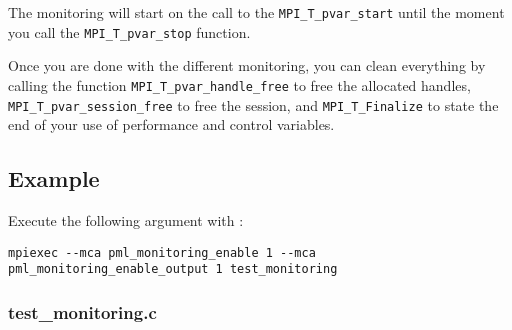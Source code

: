 \documentclass[notitlepage]{article}
\begin{document}
The monitoring will start on the call to the
\texttt{MPI\_T\_pvar\_start} until the moment you call the
\texttt{MPI\_T\_pvar\_stop} function.

Once you are done with the different monitoring, you can clean
everything by calling the function \texttt{MPI\_T\_pvar\_handle\_free}
to free the allocated handles, \texttt{MPI\_T\_pvar\_session\_free} to
free the session, and \texttt{MPI\_T\_Finalize} to state the end of
your use of performance and control variables.

\subsection{Example}

Execute the following argument with :
\begin{verbatim}
mpiexec --mca pml_monitoring_enable 1 --mca pml_monitoring_enable_output 1 test_monitoring
\end{verbatim}

\subsubsection{test\_monitoring.c}
\end{document}
